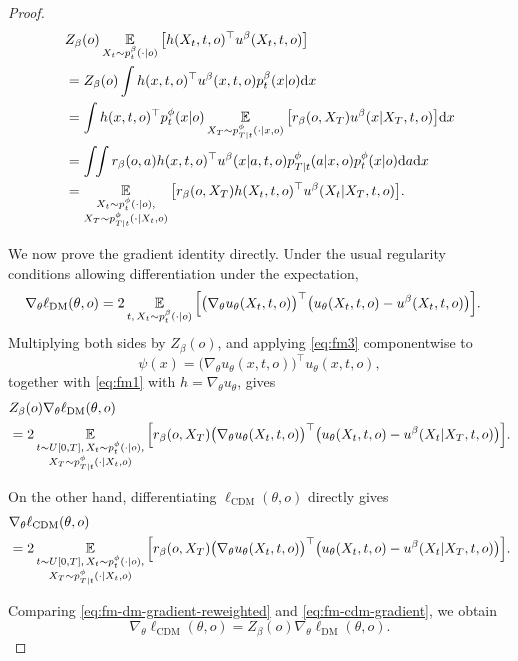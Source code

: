 \begin{proof}
\begin{align}
&Z_{\beta}(o)
\operatorname*{{\mathbb{E}}}_{X_t\sim p_t^\beta(\cdot|o)}
\big[
h(X_t,t,o)^\top u^\beta(X_t,t,o)
\big]
\notag \\
&=
Z_{\beta}(o)\int
h(x,t,o)^\top u^\beta(x,t,o)p_t^\beta(x|o)\dd x
\notag \\
&=
\int
h(x,t,o)^\top
p_t^\phi(x|o)
\operatorname*{{\mathbb{E}}}_{X_T\sim p_{T|t}^\phi(\cdot|x,o)}
\big[
r_\beta(o,X_T)u^\beta(x|X_T,t,o)
\big]
\dd x
\notag \\
&=
\int\!\!\int
r_\beta(o,a)
h(x,t,o)^\top u^\beta(x|a,t,o)
p_{T|t}^\phi(a|x,o)p_t^\phi(x|o)
\dd a\dd x
\notag \\
&=
\operatorname*{{\mathbb{E}}}_{\substack{
X_t\sim p_t^\phi(\cdot|o),\\
X_T\sim p_{T|t}^\phi(\cdot|X_t,o)
}}
\big[
r_\beta(o,X_T)
h(X_t,t,o)^\top u^\beta(X_t|X_T,t,o)
\big].\label{eq:fm1}
\end{align}

We now prove the gradient identity directly. Under the usual regularity
conditions allowing differentiation under the expectation,
\[
\begin{aligned}
\nabla_\theta \ell_{\mathrm{DM}}(\theta,o)
&=
2\operatorname*{{\mathbb{E}}}_{t,\,X_t\sim p_t^\beta(\cdot|o)}
\Big[
\big(\nabla_\theta u_\theta(X_t,t,o)\big)^\top
\big(
u_\theta(X_t,t,o)-u^\beta(X_t,t,o)
\big)
\Big].
\end{aligned}
\]
Multiplying both sides by \(Z_{\beta}(o)\), and applying
\eqref{eq:fm3} componentwise to
\[
\psi(x)
=
\big(\nabla_\theta u_\theta(x,t,o)\big)^\top
u_\theta(x,t,o),
\]
together with \eqref{eq:fm1} with
\(h=\nabla_\theta u_\theta\), gives
\begin{align}
&Z_{\beta}(o)\nabla_\theta \ell_{\mathrm{DM}}(\theta,o)\notag
\\
&=
2\operatorname*{{\mathbb{E}}}_{\substack{
t\sim U[0,T],\,
X_t\sim p_t^\phi(\cdot|o),\\
X_T\sim p_{T|t}^\phi(\cdot|X_t,o)
}}
\Big[
r_\beta(o,X_T)
\big(\nabla_\theta u_\theta(X_t,t,o)\big)^\top
\big(
u_\theta(X_t,t,o)-u^\beta(X_t|X_T,t,o)
\big)
\Big].
\label{eq:fm-dm-gradient-reweighted}
\end{align}

On the other hand, differentiating \(\ell_{\mathrm{CDM}}(\theta,o)\)
directly gives
\begin{align}
&\nabla_\theta \ell_{\mathrm{CDM}}(\theta,o)\notag \\
&=
2\operatorname*{{\mathbb{E}}}_{\substack{
t\sim U[0,T],\,
X_t\sim p_t^\phi(\cdot|o),\\
X_T\sim p_{T|t}^\phi(\cdot|X_t,o)
}}
\Big[
r_\beta(o,X_T)
\big(\nabla_\theta u_\theta(X_t,t,o)\big)^\top
\big(
u_\theta(X_t,t,o)-u^\beta(X_t|X_T,t,o)
\big)
\Big].\label{eq:fm-cdm-gradient}
\end{align}

Comparing \eqref{eq:fm-dm-gradient-reweighted} and
\eqref{eq:fm-cdm-gradient}, we obtain
\[
\nabla_\theta \ell_{\mathrm{CDM}}(\theta,o)
=
Z_{\beta}(o)\nabla_\theta \ell_{\mathrm{DM}}(\theta,o).
\]
\end{proof}












